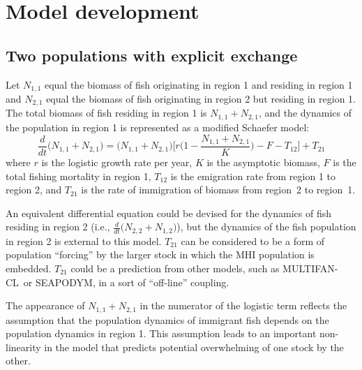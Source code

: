 \documentclass[12pt,letterpaper,twoside]{article}
\newcommand\SD{SEAPODYM}
\newcommand\MFCL{MULTIFAN-CL}
\newcommand\None{{N_{1,1}}}
\newcommand\Ntwo{{N_{2,1}}}
\newcommand\Nsum{{N_{1,1}+N_{2,1}}}
\begin{document}
\clearpage
\section{Model development}
\label{sec:models}
\subsection{Two populations with explicit exchange}
Let $\None$ equal the biomass of fish originating in region 1
and residing in region 1
and $\Ntwo$ equal the biomass of fish originating in region 2
but residing in region 1.
The total biomass of fish residing in region 1 is
$\Nsum$, and the dynamics of the population in region 1 is represented
as a modified Schaefer model:
\begin{equation}
\frac{d}{dt}\big(\Nsum\big)=\big(\Nsum\big)\Big[r\Big(1-\frac{\Nsum}{K}\Big)-F-T_{12}\Big]+T_{21}
\label{eqn:logistic}
\end{equation}
where $r$ is the logistic growth rate per year, $K$ is the
asymptotic biomass,
$F$ is the total fishing mortality in region 1, $T_{12}$
is the emigration rate from region 1 to region 2, and $T_{21}$
is the rate of immigration of biomass from region~2 to region~1.


An equivalent differential equation could be devised for the dynamics of
fish residing in region 2 
(i.e., $\frac{d}{dt}\big(N_{2,2}+N_{1,2}\big)$), but 
the dynamics of the fish population in region 2 is external to this
model. $T_{21}$ can be considered to be a form of population ``forcing''
by the larger stock in which the MHI population is embedded. $T_{21}$
could be a prediction from other models, such as \MFCL\ or \SD, 
in a sort of ``off-line'' coupling.

The appearance of
$\Nsum$ in the numerator of the logistic term reflects the assumption
that the population dynamics of immigrant fish depends on
the population dynamics in region 1. This assumption leads to an
important non-linearity in the model that predicts potential
overwhelming of one stock by the other.
\end{document}
